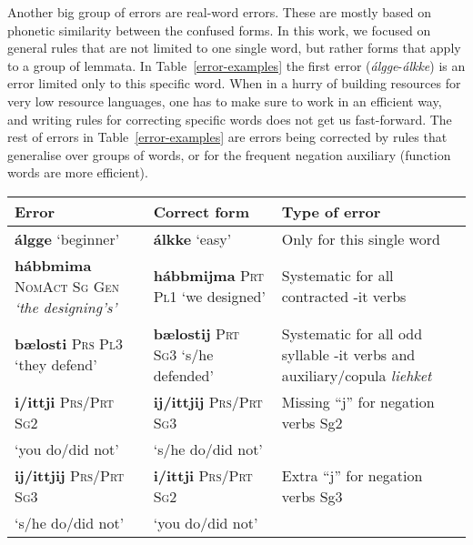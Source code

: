 \documentclass[free]{flammie}
\begin{document}
Another big group of errors are real-word errors. These are mostly based on
phonetic similarity between the confused forms. In this work, we focused on
general rules that are not limited to one single word, but rather forms that
apply to a group of lemmata. In Table~\ref{error-examples} the first error
(\textit{álgge}-\textit{álkke}) is an error limited only to  this specific word.
When in a hurry of building resources for  very low resource languages, one has
to make sure to work in an efficient way, and writing rules for correcting
specific words does not get us fast-forward. The rest of errors in
Table~\ref{error-examples} are errors being corrected by rules that generalise
over groups of words, or for the frequent negation auxiliary (function words are
more efficient).

\begin{table*}[h]
    \centering
    \begin{tabular}{p{4cm}p{4cm}p{6cm}}
         \textbf{Error} & \textbf{Correct form}  & \textbf{Type of error}\\
         \toprule
         \textbf{álgge} `beginner' & \textbf{álkke} `easy' &  Only for this
         single word \\
         \midrule
         \textbf{hábbmima} \textsc{NomAct Sg Gen} \textit{`the designing's'} &
         \textbf{hábbmijma} \textsc{Prt Pl1} `we designed' &  Systematic for all
         contracted -it verbs \\
         \midrule
         \textbf{bælosti} \textsc{Prs Pl3} `they defend' & \textbf{bælostij}
         \textsc{Prt Sg3} `s/he defended' & Systematic for all odd syllable -it
         verbs and auxiliary/copula \textit{liehket} \\
         \midrule
         \textbf{i/ittji} \textsc{Prs/Prt Sg2} & \textbf{ij/ittjij}
         \textsc{Prs/Prt Sg3} & Missing ``j'' for negation verbs Sg2 \\
           `you do/did not' & `s/he do/did not' &   \\
         \midrule
         \textbf{ij/ittjij} \textsc{Prs/Prt Sg3} & \textbf{i/ittji}
         \textsc{Prs/Prt Sg2} & Extra ``j'' for negation verbs Sg3\\
          `s/he do/did not' & `you do/did not'   \\
          \bottomrule
         \end{tabular}
    \caption{Real word errors comparison\label{error-examples}}
\end{table*}
\end{document}
